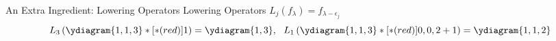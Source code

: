 \documentclass{beamer}
\newcommand{\mynone}{\ }
\begin{document}
\begin{frame}{An Extra Ingredient: Lowering Operators}
   Lowering Operators
     \(L_j(f_\lambda) = f_{\lambda-\epsilon_j}\)
            \[ L_3\left( \ydiagram{1,1,3}*[*(red)]{1} \right) =
              \ydiagram{1,3}, \ \ L_{1}\left( \ydiagram{1,1,3}*[*(red)]{0,0,2+1} \right)
              = \ydiagram{1,1,2}
              \]
\end{frame}
\end{document}
